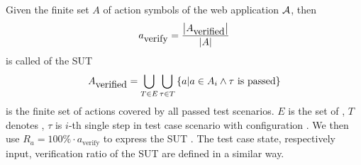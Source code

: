 \begin{defi}
Given the finite set $A$ of action symbols of the web application $\mathcal{A}$, then
\begin{equation}
a_{\mbox{verify}}=\displaystyle\frac{\left|A_{\mbox{verified}}\right|}{\left|A\right|}
\end{equation}
is called  of the SUT
\begin{equation}
A_{\mbox{verified}}=\displaystyle\bigcup_{T\in E}\displaystyle\bigcup_{\tau\in T}\left\{ a|a\in A_i\wedge \tau\mbox{ is passed}\right\}
\end{equation}
is the finite set of actions covered by all passed test scenarios. $E$ is the set of , $T$ denotes , $τ$ is $i$-th single step in test case scenario
with configuration . We then use $R_a = 100\%\cdot a_{\mbox{verify}}$ to express the SUT . The test case state, respectively input, verification ratio of the SUT are defined in a similar way.
\cite{conf/fedcsis/FrajtakBJ12}
\end{defi}